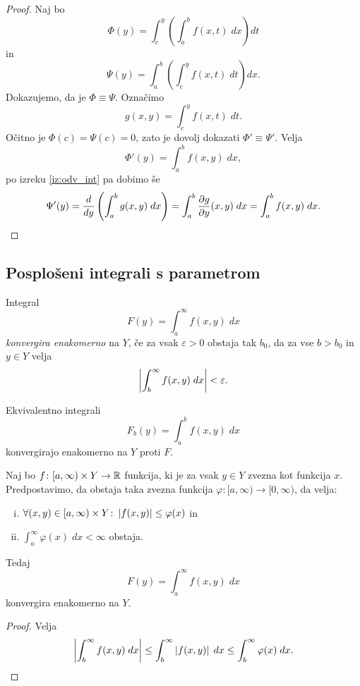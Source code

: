 \begin{proof}
Naj bo
\[
\Phi(y) = \int_c^y \left(\int_a^b f(x,t)\;dx\right) dt
\]
in
\[
\Psi(y) = \int_a^b \left(\int_c^y f(x,t)\;dt\right) dx.
\]
Dokazujemo, da je $\Phi \equiv \Psi$. Označimo
\[
g(x,y) = \int_c^y f(x,t)\;dt.
\]
Očitno je $\Phi(c) = \Psi(c) = 0$, zato je dovolj dokazati
$\Phi' \equiv \Psi'$. Velja
\[
\Phi'(y) = \int_a^b f(x,y)\;dx,
\]
po izreku \ref{iz:odv_int} pa dobimo še
\[
\Psi'(y) =
\frac{d}{dy} \left(\int_a^b g(x,y)\;dx\right) =
\int_a^b \frac{\partial g}{\partial y}(x,y)\;dx =
\int_a^b f(x,y)\;dx. \qedhere
\]
\end{proof}

\newpage

\subsection{Posplošeni integrali s parametrom}

\begin{definicija}
Integral
\[
F(y) = \int_a^\infty f(x,y)\;dx
\]
\emph{konvergira enakomerno}
na $Y$, če za vsak $\varepsilon > 0$ obstaja tak $b_0$, da za vse
$b > b_0$ in $y \in Y$ velja
\[
\left\lvert \int_b^\infty f(x,y)\;dx\right\rvert < \varepsilon.
\]
\end{definicija}

\begin{opomba}
Ekvivalentno integrali
\[
F_b(y) = \int_a^b f(x,y)\;dx
\]
konvergirajo enakomerno na $Y$ proti $F$.
\end{opomba}

\begin{trditev}
Naj bo $f \colon [a,\infty) \times Y \to \mathbb{R}$ funkcija, ki je za
vsak $y \in Y$ zvezna kot funkcija $x$. Predpostavimo, da obstaja
taka zvezna funkcija $\varphi \colon [a,\infty) \to [0,\infty)$,
da velja:

\begin{enumerate}[i)]
\item $\forall (x,y) \in [a,\infty) \times Y \colon
\left\lvert f(x,y)\right\rvert \leq \varphi(x)$ in
\item $\displaystyle \int_a^\infty \varphi(x)\;dx < \infty$
obstaja.
\end{enumerate}

Tedaj
\[
F(y) = \int_a^\infty f(x,y)\;dx
\]
konvergira enakomerno na $Y$.
\end{trditev}

\begin{proof}
Velja
\[
\left\lvert \int_b^\infty f(x,y)\;dx\right\rvert \leq
\int_b^\infty \left\lvert f(x,y)\right\rvert\;dx \leq
\int_b^\infty \varphi(x)\;dx. \qedhere
\]
\end{proof}


